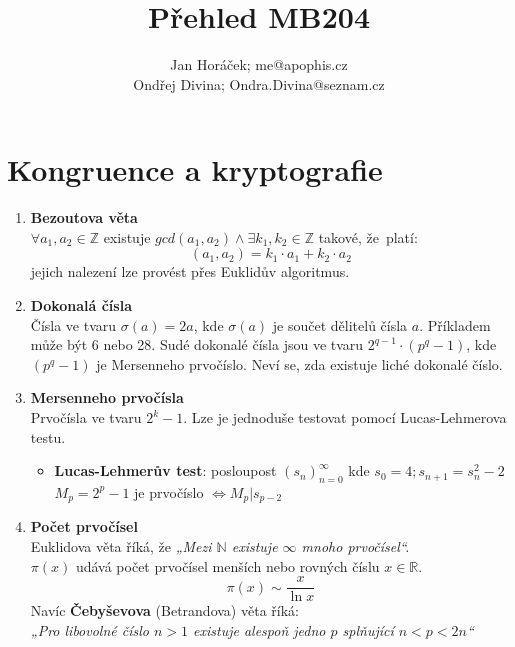 \documentclass[12pt,a4paper]{article}
\begin{document}
	\title{\vspace{-1.5cm}Přehled MB204}
	\author{Jan Horáček; me@apophis.cz \\ Ondřej Divina; Ondra.Divina@seznam.cz}
	\maketitle
	
	\section{Kongruence a kryptografie}
	
	\begin{enumerate}[leftmargin=*]
		\item \textbf{Bezoutova věta}\\
		$\forall a_1,a_2 \in  \mathbb{Z} $ existuje $gcd(a_1,a_2) \land \exists k_1,k_2 \in  \mathbb{Z} $ takové, že~platí:
		\[(a_1,a_2) = k_1 \cdot a_1 + k_2 \cdot a_2\]
		jejich nalezení lze provést přes Euklidův algoritmus.
		
		\item \textbf{Dokonalá čísla}\\
		Čísla ve tvaru $\sigma(a) = 2a$, kde $\sigma(a)$ je součet dělitelů čísla $a$. Příkladem může být 6 nebo 28. 
		Sudé dokonalé čísla jsou ve tvaru $2^{q-1}\cdot(p^q - 1)$, kde $(p^q - 1)$ je Mersenneho prvočíslo. Neví se, zda existuje liché dokonalé číslo.
		
		\item \textbf{Mersenneho prvočísla}\\
		Prvočísla ve tvaru $2^k - 1$. Lze je jednoduše testovat pomocí Lucas-Lehmerova testu.
		\begin{itemize}
			\item  \textbf{Lucas-Lehmerův test}: posloupost $(s_n)_{n=0}^{\infty}$ kde $s_0 = 4; s_{n+1} = s_n^2 - 2$\\
			$M_p = 2^p - 1 $ je prvočíslo $\Leftrightarrow M_p | s_{p-2}$
		\end{itemize}
		
		\item \textbf{Počet prvočísel}\\
		Euklidova věta říká, že\textit{ „Mezi $\mathbb{N}$ existuje $\infty$ mnoho prvočísel“.}\\
		$\pi(x)$ udává počet prvočísel menších nebo rovných číslu $x \in \mathbb{R}$. \\
		\[ \pi(x) \sim \frac{x}{\ln{x}} \]
		Navíc \textbf{Čebyševova} (Betrandova) věta říká: \\\textit{„Pro libovolné číslo $n>1$ existuje alespoň jedno $p$ splňující $n<p<2n$“}
		

\end{enumerate}
\end{document}
